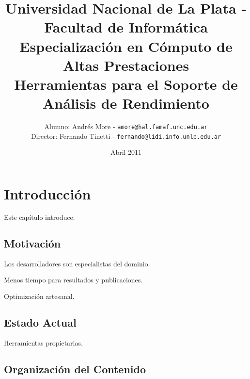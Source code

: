 \documentclass[a4paper]{report}
\begin{document}
\title{Universidad Nacional de La Plata - Facultad de Inform\'atica\\
Especializaci\'on en C\'omputo de Altas Prestaciones\\
\bigskip
Herramientas para el Soporte de An\'alisis de Rendimiento}

\author{Alumno: Andr\'es More - {\tt amore@hal.famaf.unc.edu.ar}\\
Director: Fernando Tinetti - {\tt fernando@lidi.info.unlp.edu.ar}}

\date{Abril 2011}


\tableofcontents

\chapter{Introducci\'on}

Este cap\'itulo introduce.

\section{Motivaci\'on}

Los desarrolladores son especialistas del dominio.

Menos tiempo para resultados y publicaciones.

Optimizaci\'on artesanal.

\section{Estado Actual}

Herramientas propietarias.

\section{Organizaci\'on del Contenido}
\end{document}
